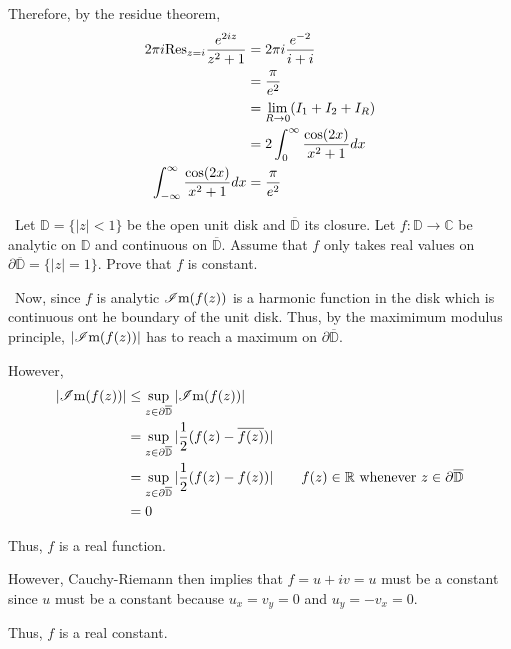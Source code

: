 \documentclass[12pt]{Qual}
\begin{document}
\begin{solution}
Therefore, by the residue theorem,
\begin{align*}
    2\pi i\text{Res}_{z=i}\frac{e^{2iz}}{z^2+1}&=2\pi i\frac{e^{-2}}{i+i}\\
    &=\frac{\pi}{e^2}\\
    &=\lim_{R\to0}(I_1+I_2+I_R)\\
    &=2\int_0^\infty\frac{\cos(2x)}{x^2+1}dx\\
    \int_{-\infty}^\infty\frac{\cos(2x)}{x^2+1}dx&=\frac{\pi}{e^2}
\end{align*}
\end{solution}
\newpage





\begin{problem} $\,$
Let $\mathbb{D}=\{|z|<1\}$ be the open unit disk and $\overline{\mathbb{D}}$ its closure. Let $f:\mathbb{D}\to\mathbb{C}$ be analytic on $\mathbb{D}$ and continuous on $\overline{\mathbb{D}}$. Assume that $f$ only takes real values on $\partial\overline{\mathbb{D}}=\{|z|=1\}.$ Prove that $f$ is constant.
\end{problem}


\begin{solution}$\,$
Now, since $f$ is analytic $\mathscr{I}\text{m}(f(z))$ is a harmonic function in the disk which is continuous ont he boundary of the unit disk. Thus, by the maximimum modulus principle, $|\mathscr{I}\text{m}(f(z))|$ has to reach a maximum on $\partial\overline{\mathbb{D}}$.

However, \begin{align*}
    |\mathscr{I}\text{m}(f(z))|&\le\sup_{z\in\partial\overline{\mathbb{D}}}|\mathscr{I}\text{m}(f(z))|\\
    &=\sup_{z\in\partial\overline{\mathbb{D}}}|\frac{1}{2}(f(z)-\overline{f(z)})|\\
    &=\sup_{z\in\partial\overline{\mathbb{D}}}|\frac{1}{2}(f(z)-f(z))|\qquad f(z)\in\mathbb{R}\text{ whenever }z\in\partial\overline{\mathbb{D}}\\
    &=0
\end{align*}

Thus, $f$ is a real function.

However, Cauchy-Riemann then implies that $f=u+iv=u$ must be a constant since $u$ must be a constant because $u_x=v_y=0$ and $u_y=-v_x=0$.

Thus, $f$ is a real constant.
\end{solution}
\end{document}
